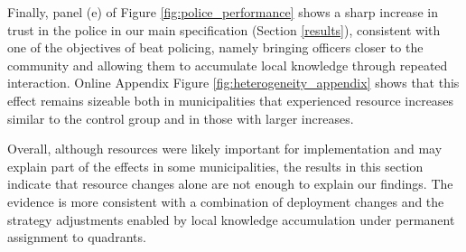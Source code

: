 Finally, panel (e) of Figure \ref{fig:police_performance} shows a sharp increase in trust in the police in our main specification (Section \ref{results}), consistent with one of the objectives of beat policing, namely bringing officers closer to the community and allowing them to accumulate local knowledge through repeated interaction. Online Appendix Figure \ref{fig:heterogeneity_appendix} shows that this effect remains sizeable both in municipalities that experienced resource increases similar to the control group and in those with larger increases.

Overall, although resources were likely important for implementation and may explain part of the effects in some municipalities, the results in this section indicate that resource changes alone are not enough to explain our findings. The evidence is more consistent with a combination of deployment changes and the strategy adjustments enabled by local knowledge accumulation under permanent assignment to quadrants.

\FloatBarrier

\FloatBarrier




 
